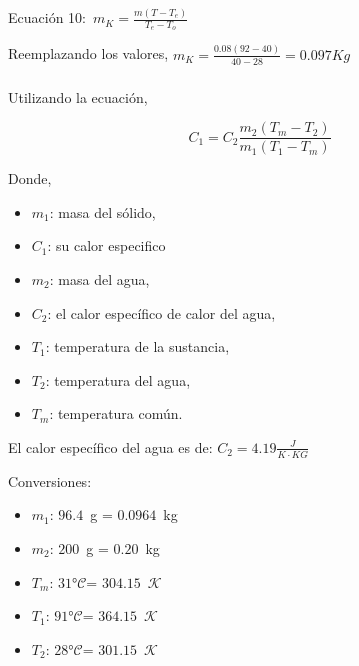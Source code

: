 \documentclass[letterpaper, 12pt]{article}
\newcommand{\Celsius}[0]{°$\mathcal{C}$}
\newcommand{\Kelvin}[0]{$\mathcal{K}$}
\begin{document}
\subsubsection{}

Ecuación 10:~$m_K = \frac{m (T - T_e)}{T_e - T_o}$

Reemplazando los valores, $m_K = \frac{0.08 (92 - 40)}{40 -
            28} = 0.097 Kg$

\subsubsection{}

Utilizando la ecuación,

\begin{equation}
      C_{1} = C_{2} \frac{m_{2} (T_{m} - T_{2})}{m_1 (T_{1} - T_{m})}
      \label{eq:calor_especifico_1}
\end{equation}

Donde,

\begin{itemize}[label=$\triangleright$]
      \item $m_{1}$: masa del sólido,
      \item $C_{1}$: su calor especifico
      \item $m_{2}$: masa del agua,
      \item $C_{2}$: el calor específico de calor del agua,
      \item $T_{1}$: temperatura de la sustancia,
      \item $T_{2}$: temperatura del agua,
      \item $T_{m}$: temperatura común.
\end{itemize}

El calor específico del agua es de: \hfill{} \break{}
$C_{2} = 4.19\frac{J}{K\cdot KG}$

\smallskip

Conversiones:

\begin{itemize}[label=$\triangleright$]
      \item $m_{1}$: $96.4$~g = $0.0964$~kg
      \item $m_{2}$: $200$~g = $0.20$~kg
      \item $T_{m}$: $31$\Celsius = $304.15$~\Kelvin
      \item $T_{1}$: $91$\Celsius = $364.15$~\Kelvin
      \item $T_{2}$: $28$\Celsius = $301.15$~\Kelvin
\end{itemize}
\end{document}
